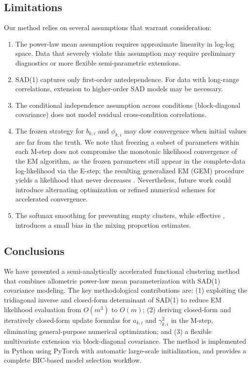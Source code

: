 \documentclass[12pt,a4paper]{article}
\begin{document}
\subsection{Limitations}

Our method relies on several assumptions that warrant consideration:

\begin{enumerate}[leftmargin=*]
    \item The power-law mean assumption requires approximate linearity in log-log space. Data that severely violate this assumption may require preliminary diagnostics or more flexible semi-parametric extensions.
    \item SAD(1) captures only first-order antedependence. For data with long-range correlations, extension to higher-order SAD models \cite{zimmerman2001parametric} may be necessary.
    \item The conditional independence assumption across conditions (block-diagonal covariance) does not model residual cross-condition correlations.
    \item The frozen strategy for $b_{k,i}$ and $\phi_{k,i}$ may slow convergence when initial values are far from the truth. We note that freezing a subset of parameters within each M-step does not compromise the monotonic likelihood convergence of the EM algorithm, as the frozen parameters still appear in the complete-data log-likelihood via the E-step; the resulting generalized EM (GEM) procedure yields a likelihood that never decreases \cite{banfield1993model}. Nevertheless, future work could introduce alternating optimization or refined numerical schemes for accelerated convergence.
    \item The softmax smoothing for preventing empty clusters, while effective \cite{pan2026improved}, introduces a small bias in the mixing proportion estimates.
\end{enumerate}

\subsection{Conclusions}

We have presented a semi-analytically accelerated functional clustering method that combines allometric power-law mean parameterization with SAD(1) covariance modeling. The key methodological contributions are: (1) exploiting the tridiagonal inverse and closed-form determinant of SAD(1) to reduce EM likelihood evaluation from $O(m^3)$ to $O(m)$; (2) deriving closed-form and iteratively closed-form update formulas for $a_{k,i}$ and $\gamma_{k,i}^2$ in the M-step, eliminating general-purpose numerical optimization; and (3) a flexible multivariate extension via block-diagonal covariance. The method is implemented in Python using PyTorch with automatic large-scale initialization, and provides a complete BIC-based model selection workflow.
\end{document}
